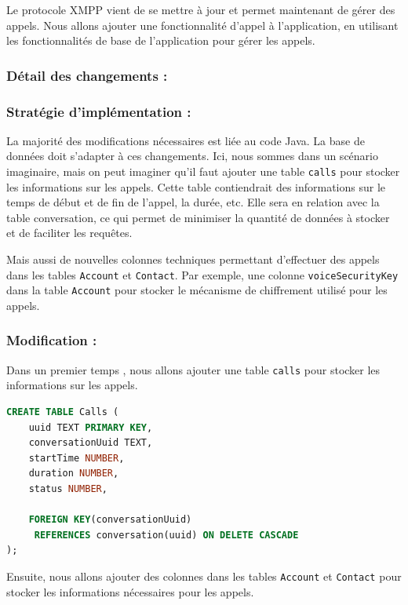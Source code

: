 \documentclass[a4paper,11pt]{article}
\begin{document}
Le protocole XMPP vient de se mettre à jour et permet maintenant de gérer des appels. Nous allons ajouter une fonctionnalité d'appel à l'application, en utilisant les fonctionnalités de base de l'application pour gérer les appels.

\subsubsection*{Détail des changements :}

\subsubsection*{Stratégie d'implémentation :}

La majorité des modifications nécessaires est liée au code Java. La base de données doit s'adapter à ces changements. Ici, nous sommes dans un scénario imaginaire, mais on peut imaginer qu'il faut ajouter une table \texttt{calls} pour stocker les informations sur les appels. Cette table contiendrait des informations sur le temps de début et de fin de l'appel, la durée, etc. Elle sera en relation avec la table conversation, ce qui permet de minimiser la quantité de données à stocker et de faciliter les requêtes.

Mais aussi de nouvelles colonnes techniques permettant d'effectuer des appels dans les tables \texttt{Account} et \texttt{Contact}. Par exemple, une colonne \texttt{voiceSecurityKey} dans la table \texttt{Account} pour stocker le mécanisme de chiffrement utilisé pour les appels. 

\subsubsection*{Modification :}

Dans un premier temps , nous allons ajouter une table \texttt{calls} pour stocker les informations sur les appels.

\begin{lstlisting}[language=SQL]
CREATE TABLE Calls (
	uuid TEXT PRIMARY KEY,
	conversationUuid TEXT,
	startTime NUMBER,
	duration NUMBER,
	status NUMBER,

	FOREIGN KEY(conversationUuid) 
	 REFERENCES conversation(uuid) ON DELETE CASCADE
);
\end{lstlisting}

Ensuite, nous allons ajouter des colonnes dans les tables \texttt{Account} et \texttt{Contact} pour stocker les informations nécessaires pour les appels.
\end{document}
